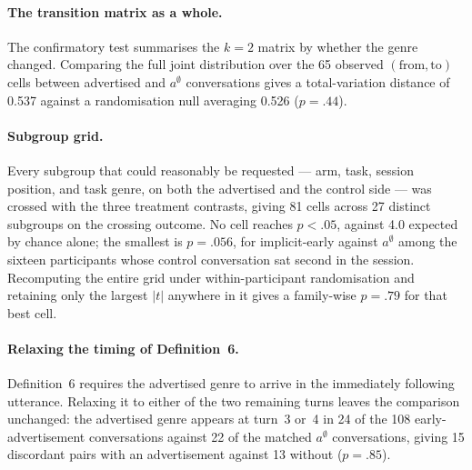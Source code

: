\paragraph{The transition matrix as a whole.}
The confirmatory test summarises the \(k=2\) matrix by whether the genre changed. Comparing the full joint distribution over the 65 observed \((\text{from},\text{to})\) cells between advertised and \(a^{\emptyset}\) conversations gives a total-variation distance of 0.537 against a randomisation null averaging 0.526 (\(p=.44\)).

\paragraph{Subgroup grid.}
Every subgroup that could reasonably be requested --- arm, task, session position, and task genre, on both the advertised and the control side --- was crossed with the three treatment contrasts, giving 81 cells across 27 distinct subgroups on the crossing outcome. No cell reaches \(p<.05\), against 4.0 expected by chance alone; the smallest is \(p=.056\), for implicit-early against \(a^{\emptyset}\) among the sixteen participants whose control conversation sat second in the session. Recomputing the entire grid under within-participant randomisation and retaining only the largest \(|t|\) anywhere in it gives a family-wise \(p=.79\) for that best cell.

\paragraph{Relaxing the timing of Definition~6.}
Definition~6 requires the advertised genre to arrive in the immediately following utterance. Relaxing it to either of the two remaining turns leaves the comparison unchanged: the advertised genre appears at turn~3 or~4 in 24 of the 108 early-advertisement conversations against 22 of the matched \(a^{\emptyset}\) conversations, giving 15 discordant pairs with an advertisement against 13 without (\(p=.85\)).
